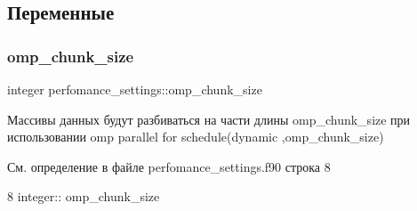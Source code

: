 \subsection{Переменные}
\mbox{\label{namespaceperfomance__settings_a1632739c07471b87731fe9e33f69fcae}} 
\subsubsection{\texorpdfstring{omp\+\_\+chunk\+\_\+size}{omp\_chunk\_size}}
{\footnotesize\ttfamily integer perfomance\+\_\+settings\+::omp\+\_\+chunk\+\_\+size}



Массивы данных будут разбиваться на части длины omp\+\_\+chunk\+\_\+size при использовании omp parallel for schedule(dynamic ,omp\+\_\+chunk\+\_\+size) 



См. определение в файле perfomance\+\_\+settings.\+f90 строка 8


\begin{DoxyCode}
8 \textcolor{keywordtype}{integer}:: omp\_chunk\_size
\end{DoxyCode}
